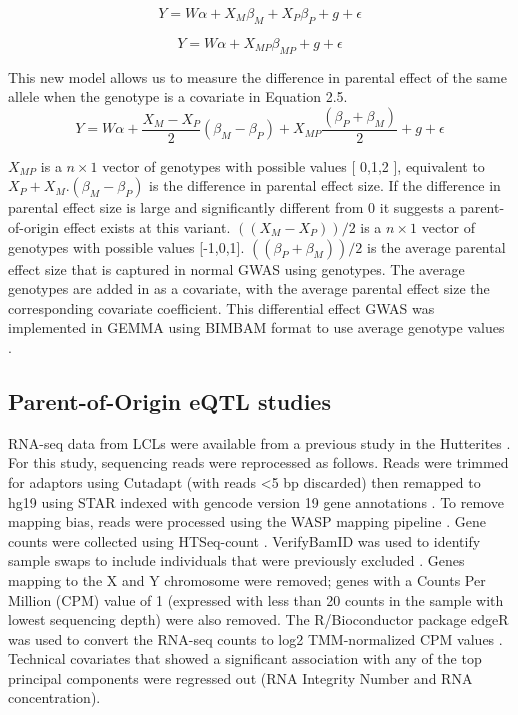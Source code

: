 \begin{equation}
Y =W\alpha + X_{M}\beta_{M}+ X_{P}\beta_{P}+g+\epsilon
\end{equation}

\begin{equation}
Y =W\alpha + X_{MP}\beta_{MP}+g+\epsilon
\end{equation}

This new model allows us to measure the difference in parental effect of the same allele when the genotype is a covariate in Equation 2.5. 
\begin{equation}
Y =W\alpha + \frac{X_{M}-X_{P}}{2}(\beta_{M}-\beta_{P}) + X_{MP}\frac{(\beta_{P}+\beta_{M})}{2} +g+\epsilon
\end{equation}

$X_{MP}$ is a $n \times 1$ vector of genotypes with possible values [ 0,1,2 ], equivalent to $X_P+ X_M. (\beta_M-\beta_P )$ is the difference in parental effect size. If the difference in parental effect size is large and significantly different from 0 it suggests a parent-of-origin effect exists at this variant. $((X_M-X_P ))/2$ is a $n \times 1$ vector of genotypes with possible values [-1,0,1].  $((\beta_P+\beta_M))/2$   is the average parental effect size that is captured in normal GWAS using genotypes. The average genotypes are added in as a covariate, with the average parental effect size the corresponding covariate coefficient. This differential effect GWAS was implemented in GEMMA using BIMBAM format to use average genotype values \cite{Servin:2007gj}.


\subsection{Parent-of-Origin eQTL studies}\label{Parent-of-Origin eQTL studies}

RNA-seq data from LCLs were available from a previous study in the Hutterites \cite{Cusanovich:2016id}. For this study, sequencing reads were reprocessed as follows. Reads were trimmed for adaptors using Cutadapt (with reads \textless5 bp discarded) then remapped to hg19 using STAR indexed with gencode version 19 gene annotations \cite{Dobin:2002by,Martin:2011eu}. To remove mapping bias, reads were processed using the WASP mapping pipeline \cite{vandeGeijn:2015hi}. Gene counts were collected using HTSeq-count \cite{Anders:2015gf}. VerifyBamID was used to identify sample swaps to include individuals that were previously excluded \cite{Jun:2012je}. Genes mapping to the X and Y chromosome were removed; genes with a Counts Per Million (CPM) value of 1 (expressed with less than 20 counts in the sample with lowest sequencing depth) were also removed. The R/Bioconductor package edgeR was used to convert the RNA-seq counts to log2 TMM-normalized CPM values \cite{Robinson:2010dd,Robinson:2010cw}. Technical covariates that showed a significant association with any of the top principal components were regressed out (RNA Integrity Number and RNA concentration).



